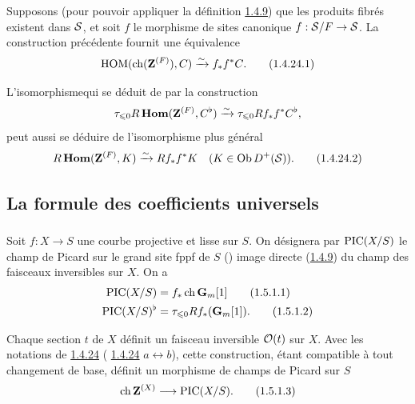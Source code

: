 \documentclass[10pt]{../fichiers-configuration-latex/smfart}
\begin{document}
Supposons (pour pouvoir appliquer la définition
\hyperref[XVIII.subsubsec1.4.9]{1.4.9}) que les
produits fibrés existent dans ${\mathcal S}$, et soit $f$ le morphisme
de sites canonique $f:{\mathcal S}/F\rightarrow {\mathcal S}$. La
construction précédente fournit une équivalence
\begin{equation*}
\operatorname{HOM}(\operatorname{ch}(\mathbf{Z}^{(F)}),C)\xrightarrow{\sim}
f_{\ast}f^{\ast}C{}.\tag{1.4.24.1}
\end{equation*}

L'isomorphisme\pageoriginale qui se déduit de  par la construction
$$
\tau_{\leqslant 0} R\operatorname{\mathbf{Hom}}(\mathbf{Z}^{(F)},C^{\flat})\xrightarrow{\sim}
\tau_{\leqslant 0} Rf_{\ast} f^{\ast}C^{\flat}{},
$$
peut aussi se déduire de l'isomorphisme plus général
\begin{equation*}
R\operatorname{\mathbf{Hom}}(\mathbf{Z}^{(F)},K)\xrightarrow{\sim}
Rf_{\ast}f^{\ast}K\quad (K\in \operatorname{Ob} D^{+}({\mathcal S})){}.\tag{1.4.24.2}
\end{equation*}

\subsection{La formule des coefficients universels}

\subsubsection{}
Soit $f:X\rightarrow S$ une courbe projective et lisse sur $S$. On
désignera par $\operatorname{PIC}(X/S)$ le champ de Picard sur le grand site fppf de
$S$ () image directe (\hyperref[XVIII.subsubsec1.4.9]{1.4.9}) du champ
des faisceaux inversibles sur $X$. On a
\begin{align*}
\operatorname{PIC}(X/S)&= f_{\ast}\operatorname{ch}\mathbf{G}_{m}[1]\tag{1.5.1.1}\\
\operatorname{PIC}(X/S)^{\flat} &=\tau_{\leqslant 0}
Rf_{\ast}(\mathbf{G}_{m}[1]){}.\tag{1.5.1.2}
\end{align*}

Chaque section $t$ de $X$ définit un faisceau inversible ${\mathcal O}(t)$
sur $X$. Avec les notations de \hyperref[XVIII.subsubsec1.4.24]{1.4.24} (\cf
\hyperref[XVIII.subsubsec1.4.24]{1.4.24} $a\leftrightarrow b$), cette
construction, étant compatible à tout changement de base, 
définit un morphisme de champs de Picard sur $S$
\begin{equation*}
\operatorname{ch} \mathbf{Z}^{(X)}\longrightarrow \operatorname{PIC}(X/S){}.\tag{1.5.1.3}
\end{equation*}
\end{document}
